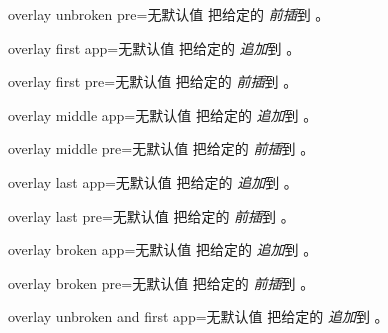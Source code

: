 \begin{docTcbKey}{overlay unbroken pre}{=}{无默认值}
  把给定的  \emph{前插}到 。
\end{docTcbKey}

\begin{docTcbKey}{overlay first app}{=}{无默认值}
  把给定的  \emph{追加}到 。
\end{docTcbKey}

\begin{docTcbKey}{overlay first pre}{=}{无默认值}
  把给定的  \emph{前插}到 。
\end{docTcbKey}

\clearpage
\begin{docTcbKey}{overlay middle app}{=}{无默认值}
  把给定的  \emph{追加}到 。
\end{docTcbKey}

\begin{docTcbKey}{overlay middle pre}{=}{无默认值}
  把给定的  \emph{前插}到 。
\end{docTcbKey}

\begin{docTcbKey}{overlay last app}{=}{无默认值}
  把给定的  \emph{追加}到 。
\end{docTcbKey}

\begin{docTcbKey}{overlay last pre}{=}{无默认值}
  把给定的  \emph{前插}到 。
\end{docTcbKey}

\begin{docTcbKey}{overlay broken app}{=}{无默认值}
  把给定的  \emph{追加}到 。
\end{docTcbKey}

\begin{docTcbKey}{overlay broken pre}{=}{无默认值}
  把给定的  \emph{前插}到 。
\end{docTcbKey}

\begin{docTcbKey}{overlay unbroken and first app}{=}{无默认值}
  把给定的  \emph{追加}到 。
\end{docTcbKey}

